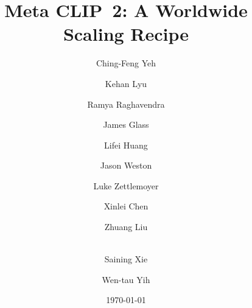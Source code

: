 \documentclass[]{fairmeta}
\title{Meta CLIP~2: A Worldwide Scaling Recipe}
\author[1,2,*]{\color{borderpurple}{Yung-Sung Chuang}}
\author[1]{\color{borderpurple}{Yang Li}}
\author[1]{\color{borderpurple}{Dong Wang}}
\author[1]{Ching-Feng Yeh}
\author[1]{Kehan Lyu}
\author[1]{Ramya Raghavendra}
\author[2]{James Glass}
\author[1]{Lifei Huang}
\author[1]{Jason Weston}
\author[1]{Luke Zettlemoyer}
\author[1,\$]{Xinlei Chen}
\author[3]{Zhuang Liu}
\author[4]{\\Saining Xie}
\author[1]{Wen-tau Yih}
\author[1,\dagger]{\color{borderpurple}{Shang-Wen Li}}
\author[1,\dagger]{\color{borderpurple}{Hu Xu}}
\affiliation[1]{FAIR, Meta}
\affiliation[2]{MIT}
\affiliation[3]{Princeton University}
\affiliation[4]{New York University}
\date{\today}
\begin{document}
\maketitle











\clearpage
\newpage



\clearpage
\newpage
\beginappendix


\end{document}
